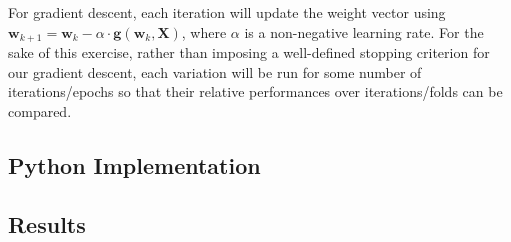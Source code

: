 \documentclass{article}
\begin{document}
For gradient descent, each iteration will update the weight vector using $\mathbf{w}_{k+1} = \mathbf{w}_{k} - \alpha \cdot \mathbf{g}(\mathbf{w}_{k}, \mathbf{X})$, where $\alpha$ is a non-negative learning rate. For the sake of this exercise, rather than imposing a well-defined stopping criterion for our gradient descent, each variation will be run for some number of iterations/epochs so that their relative performances over iterations/folds can be compared.

\subsection{Python Implementation}

\subsection{Results}
\end{document}
